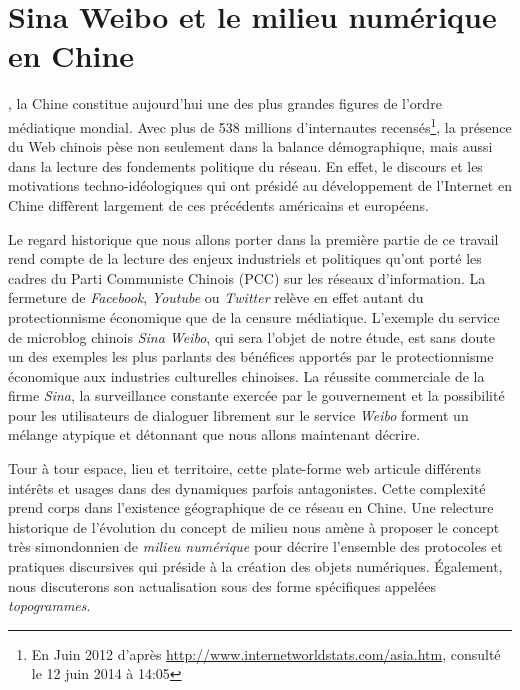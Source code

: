 ﻿\chapter{Sina Weibo et le milieu numérique en Chine} 

, la Chine constitue aujourd'hui une des plus grandes figures de l'ordre médiatique mondial. Avec plus de 538 millions d'internautes recensés\footnote{En Juin 2012 d'après  \url{http://www.internetworldstats.com/asia.htm}, consulté le 12 juin 2014 à 14:05}, la présence du Web chinois pèse non seulement dans la balance démographique, mais aussi dans la lecture des fondements politique du réseau. En effet, le discours et les motivations techno-idéologiques qui ont présidé au développement de l'Internet en Chine diffèrent largement de ces précédents américains et européens. 

Le regard historique que nous allons porter dans la première partie de ce travail rend compte de la lecture des enjeux industriels et politiques qu'ont porté les cadres du Parti Communiste Chinois (PCC) sur les réseaux d'information. La fermeture de \textit{Facebook}, \textit{Youtube} ou \textit{Twitter} relève en effet autant du protectionnisme économique que de la censure médiatique. L'exemple du service de microblog chinois \textit{Sina Weibo}, qui sera l'objet de notre étude, est sans doute un des exemples les plus parlants des bénéfices apportés par le protectionnisme économique aux industries culturelles chinoises. La réussite commerciale de la firme \textit{Sina}, la surveillance constante exercée par le gouvernement et la  possibilité pour les utilisateurs de dialoguer librement sur le service \textit{Weibo} forment un mélange atypique et détonnant que nous allons maintenant décrire.

Tour à tour espace, lieu et territoire, cette plate-forme web articule  différents intérêts et usages dans des dynamiques parfois antagonistes. Cette complexité prend corps dans l'existence géographique de ce réseau en Chine. Une relecture historique de l'évolution du concept de milieu nous amène à proposer le concept très simondonnien de \textit{milieu numérique} pour décrire l’ensemble des protocoles et pratiques discursives qui préside à la création des objets numériques. Également, nous discuterons son actualisation sous des forme spécifiques appelées \textit{topogrammes}.


